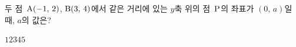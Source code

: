 두 점~$\mathrm{A}(-1,\,2)$, $\mathrm{B}(3,\,4)$에서 같은 거리에 있는 $y$축 위의 점~$\mathrm{P}$의 좌표가 $(0,\,a)$일 때, $a$의 값은?
\begin{choices32}{$1$}{$2$}{$3$}{$4$}{$5$}\end{choices32}

